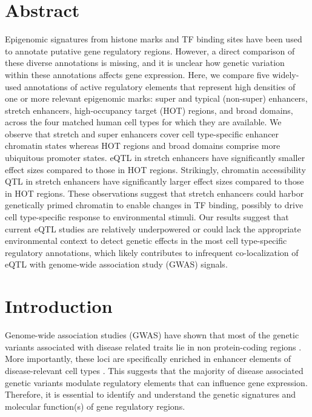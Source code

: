 \section{Abstract}
Epigenomic signatures from histone marks and \ac{TF} binding sites have been used to annotate putative gene regulatory regions. However, a direct comparison of these diverse annotations is missing, and it is unclear how genetic variation within these annotations affects gene expression. Here, we compare five widely-used annotations of active regulatory elements that represent high densities of one or more relevant epigenomic marks: super and typical (non-super) enhancers, stretch enhancers, high-occupancy target (HOT) regions, and broad domains, across the four matched human cell types for which they are available. We observe that stretch and super enhancers cover cell type-specific enhancer chromatin states whereas HOT regions and broad domains comprise more ubiquitous promoter states. \ac{eQTL} in stretch enhancers have significantly smaller effect sizes compared to those in HOT regions. Strikingly, chromatin accessibility QTL in stretch enhancers have significantly larger effect sizes compared to those in HOT regions. These observations suggest that stretch enhancers could harbor genetically primed chromatin to enable changes in TF binding, possibly to drive cell type-specific response to environmental stimuli. Our results suggest that current eQTL studies are relatively underpowered or could lack the appropriate environmental context to detect genetic effects in the most cell type-specific regulatory annotations, which likely contributes to infrequent co-localization of eQTL with genome-wide association study (GWAS) signals.

\section{Introduction}
Genome-wide association studies (GWAS) have shown that most of the genetic variants associated with disease related traits lie in non protein-coding regions \cite{hindorffPotentialEtiologicFunctional2009}. More importantly, these loci are specifically enriched in enhancer elements of disease-relevant cell types \cite{theencodeprojectconsortiumIntegratedEncyclopediaDNA2012, mauranoSystematicLocalizationCommon2012, trynkaChromatinMarksIdentify2013, parkerChromatinStretchEnhancer2013, corradinCombinatorialEffectsMultiple2014,pasqualiPancreaticIsletEnhancer2014, quangMotifSignaturesStretch2015}. This suggests that the majority of disease associated genetic variants modulate regulatory elements that can influence gene expression. Therefore, it is essential to identify and understand the genetic signatures and molecular function(s) of gene regulatory regions. \\

